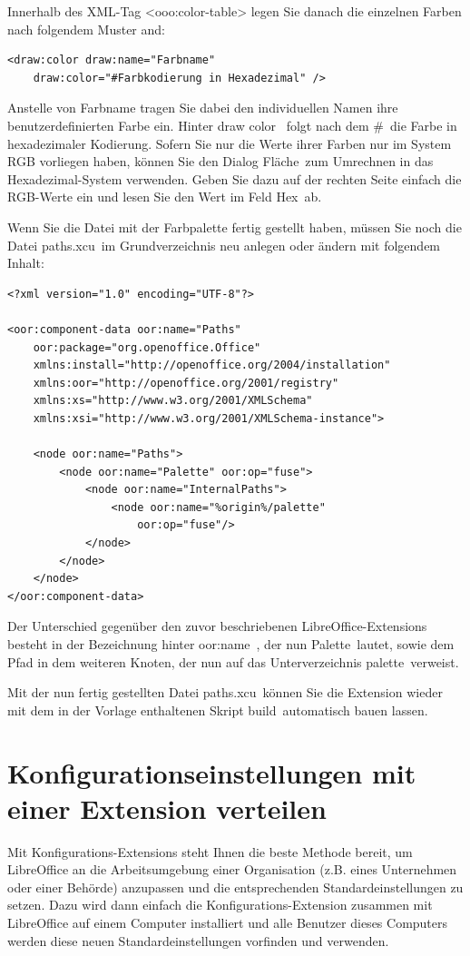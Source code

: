\documentclass[a4paper,10pt,pagesize,titlepage]{scrbook}
\begin{document}
Innerhalb des XML-Tag <ooo:color-table> legen Sie danach die einzelnen Farben nach folgendem Muster and:

\begin{lstlisting}
<draw:color draw:name="Farbname" 
    draw:color="#Farbkodierung in Hexadezimal" />
\end{lstlisting}

Anstelle von Farbname tragen Sie dabei den individuellen Namen ihre benutzerdefinierten Farbe ein. Hinter \glqq draw color\grqq~ folgt nach dem \glqq \#\grqq~die Farbe in hexadezimaler Kodierung. Sofern Sie nur die Werte ihrer Farben nur im System RGB vorliegen haben, können Sie den Dialog \glqq Fläche\grqq~zum Umrechnen in das Hexadezimal-System verwenden. Geben Sie dazu auf der rechten Seite einfach die RGB-Werte ein und lesen Sie den Wert im Feld \glqq Hex\grqq~ab.

Wenn Sie die Datei mit der Farbpalette fertig gestellt haben, müssen Sie noch die Datei \glqq paths.xcu\grqq~im Grundverzeichnis neu anlegen oder ändern mit folgendem Inhalt:


\begin{lstlisting}
<?xml version="1.0" encoding="UTF-8"?>

<oor:component-data oor:name="Paths" 
    oor:package="org.openoffice.Office" 
    xmlns:install="http://openoffice.org/2004/installation" 
    xmlns:oor="http://openoffice.org/2001/registry"
    xmlns:xs="http://www.w3.org/2001/XMLSchema" 
    xmlns:xsi="http://www.w3.org/2001/XMLSchema-instance">

    <node oor:name="Paths">
        <node oor:name="Palette" oor:op="fuse">
            <node oor:name="InternalPaths">
                <node oor:name="%origin%/palette" 
                    oor:op="fuse"/>
            </node>
        </node>
    </node>
</oor:component-data>
\end{lstlisting}

Der Unterschied gegenüber den zuvor beschriebenen LibreOffice-Extensions besteht in der Bezeichnung hinter \glqq oor:name\grqq~, der nun \glqq Palette\grqq~lautet, sowie dem Pfad in dem weiteren Knoten, der nun auf das Unterverzeichnis \glqq palette\grqq~verweist.

Mit der nun fertig gestellten Datei \glqq paths.xcu\grqq~können Sie die Extension wieder mit dem in der Vorlage enthaltenen Skript \glqq build\grqq~automatisch bauen lassen.


\chapter{Konfigurationseinstellungen mit einer Extension verteilen}

Mit Konfigurations-Extensions steht Ihnen die beste Methode bereit, um LibreOffice an die Arbeitsumgebung einer Organisation (z.B. eines Unternehmen oder einer Behörde) anzupassen und die entsprechenden Standardeinstellungen zu setzen. Dazu wird dann einfach die Konfigurations-Extension zusammen mit LibreOffice auf einem Computer installiert und alle Benutzer dieses Computers werden diese neuen Standardeinstellungen vorfinden und verwenden.
\end{document}
